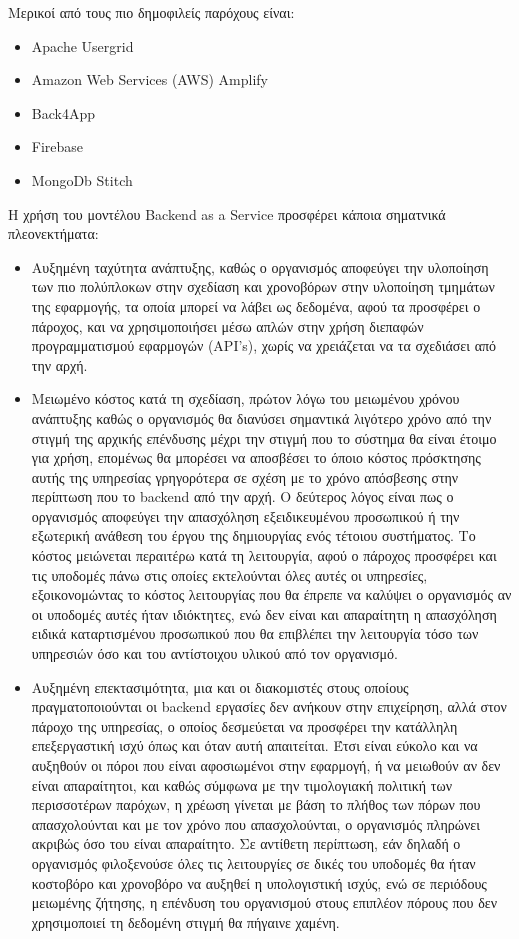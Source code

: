 \documentclass{article}
\begin{document}
Μερικοί από τους πιο δημοφιλείς παρόχους είναι:
\begin{itemize}
\item Apache Usergrid
\item Amazon Web Services (AWS) Amplify
\item Back4App
\item Firebase
\item MongoDb Stitch
\end{itemize}
Η χρήση του μοντέλου Backend as a Service προσφέρει κάποια σηματνικά πλεονεκτήματα:
\begin{itemize}
\item Αυξημένη ταχύτητα ανάπτυξης, καθώς ο οργανισμός αποφεύγει την υλοποίηση των πιο πολύπλοκων στην σχεδίαση και χρονοβόρων στην υλοποίηση τμημάτων της εφαρμογής, τα οποία μπορεί να λάβει ως δεδομένα, αφού τα προσφέρει ο πάροχος, και να χρησιμοποιήσει μέσω απλών στην χρήση διεπαφών προγραμματισμού εφαρμογών (API’s), χωρίς να χρειάζεται να τα σχεδιάσει από την αρχή.
\item Μειωμένο κόστος κατά τη σχεδίαση, πρώτον λόγω του μειωμένου χρόνου ανάπτυξης καθώς ο οργανισμός θα διανύσει σημαντικά λιγότερο χρόνο από την στιγμή της αρχικής επένδυσης μέχρι την στιγμή που το σύστημα θα είναι έτοιμο για χρήση, επομένως θα μπορέσει να αποσβέσει το όποιο κόστος πρόσκτησης αυτής της υπηρεσίας γρηγορότερα σε σχέση με το χρόνο απόσβεσης στην περίπτωση που το backend από την αρχή. Ο δεύτερος λόγος είναι πως ο οργανισμός αποφεύγει την απασχόληση εξειδικευμένου προσωπικού ή την εξωτερική ανάθεση του έργου της δημιουργίας ενός τέτοιου συστήματος. Το κόστος μειώνεται περαιτέρω κατά τη λειτουργία, αφού ο πάροχος προσφέρει και τις υποδομές πάνω στις οποίες εκτελούνται όλες αυτές οι υπηρεσίες, εξοικονομώντας το κόστος λειτουργίας που θα έπρεπε να καλύψει ο οργανισμός αν οι υποδομές αυτές ήταν ιδιόκτητες, ενώ δεν είναι και απαραίτητη η απασχόληση ειδικά καταρτισμένου προσωπικού που θα επιβλέπει την λειτουργία τόσο των υπηρεσιών όσο και του αντίστοιχου υλικού από τον οργανισμό.
\item Αυξημένη επεκτασιμότητα, μια και οι διακομιστές στους οποίους πραγματοποιούνται οι backend εργασίες δεν ανήκουν στην επιχείρηση, αλλά στον πάροχο της υπηρεσίας, ο οποίος δεσμεύεται να προσφέρει την κατάλληλη επεξεργαστική ισχύ όπως και όταν αυτή απαιτείται. Έτσι είναι εύκολο και να αυξηθούν οι πόροι που είναι αφοσιωμένοι στην εφαρμογή, ή να μειωθούν αν δεν είναι απαραίτητοι, και καθώς σύμφωνα με την τιμολογιακή πολιτική των περισσοτέρων παρόχων, η χρέωση γίνεται με βάση το πλήθος των πόρων που απασχολούνται και με τον χρόνο που απασχολούνται, ο οργανισμός πληρώνει ακριβώς όσο του είναι απαραίτητο. Σε αντίθετη περίπτωση, εάν δηλαδή ο οργανισμός φιλοξενούσε όλες τις λειτουργίες σε δικές του υποδομές θα ήταν κοστοβόρο και χρονοβόρο να αυξηθεί η υπολογιστική ισχύς, ενώ σε περιόδους μειωμένης ζήτησης, η επένδυση του οργανισμού στους επιπλέον πόρους που δεν χρησιμοποιεί τη δεδομένη στιγμή θα πήγαινε χαμένη.

\end{itemize}
\end{document}
